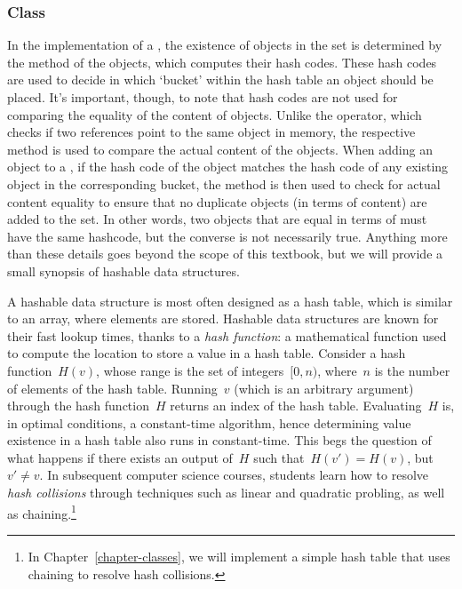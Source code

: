 \subsubsection*{ Class}
In the implementation of a , the existence of objects in the set is determined by the  method of the objects, which computes their hash codes. 
These hash codes are used to decide in which `bucket' within the hash table an object should be placed. 
It's important, though, to note that hash codes are not used for comparing the equality of the content of objects. 
Unlike the \ttt{==} operator, which checks if two references point to the same object in memory, the respective  method is used to compare the actual content of the objects. 
When adding an object to a , if the hash code of the object matches the hash code of any existing object in the corresponding bucket, the  method is then used to check for actual content equality to ensure that no duplicate objects (in terms of content) are added to the set. 
In other words, two objects that are equal in terms of  must have the same hashcode, but the converse is not necessarily true. 
Anything more than these details goes beyond the scope of this textbook, but we will provide a small synopsis of hashable data structures.

A hashable data structure is most often designed as a hash table, which is similar to an array, where elements are stored. 
Hashable data structures are known for their fast lookup times, thanks to a \emph{hash function}: a mathematical function used to compute the location to store a value in a hash table. 
Consider a hash function~$H(v)$, whose range is the set of integers~$[0, n)$, where~$n$ is the number of elements of the hash table. 
Running~$v$ (which is an arbitrary argument) through the hash function~$H$ returns an index of the hash table. 
Evaluating~$H$ is, in optimal conditions, a constant-time algorithm, hence determining value existence in a hash table also runs in constant-time. 
This begs the question of what happens if there exists an output of~$H$ such that~$H(v') = H(v)$, but $v' \neq v$. 
In subsequent computer science courses, students learn how to resolve \emph{hash collisions} through techniques such as linear and quadratic probling, as well as chaining.\footnote{In Chapter~\ref{chapter-classes}, we will implement a simple hash table that uses chaining to resolve hash collisions.}

